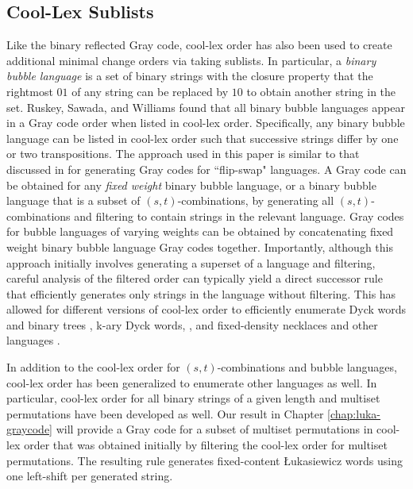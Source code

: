 



\subsection{Cool-Lex Sublists}

Like the binary reflected Gray code, cool-lex order has also been used to create additional minimal change orders via taking sublists. In particular, a \emph{binary bubble language} is a set of binary strings with the closure property that the rightmost $01$ of any string can be replaced by $10$ to obtain another string in the set.  Ruskey, Sawada, and Williams found that all binary bubble languages appear in a Gray code order when listed in cool-lex order.  Specifically, any binary bubble language can be listed in cool-lex order such that successive strings differ by one or two transpositions.  The approach used in this paper is similar to that discussed in \cite{sawada2021inside} for generating Gray codes for ``flip-swap" languages.  A Gray code can be obtained for any \emph{fixed weight} binary bubble language, or a binary bubble language that is a subset of $(s,t)$-combinations, by generating all $(s,t)$-combinations and filtering to contain strings in the relevant language.  Gray codes for bubble languages of varying weights can be obtained by concatenating fixed weight binary bubble language Gray codes together.
Importantly, although this approach initially involves generating a superset of a language and filtering, careful analysis of the filtered order can typically yield a direct successor rule that efficiently generates only strings in the language without filtering.  This has allowed for different versions of cool-lex order to efficiently enumerate Dyck words and binary trees \cite{ruskey2008generating}, k-ary Dyck words, \cite{durocher2012cool}, and fixed-density necklaces and other languages \cite{sawada2009fixed}.  

In addition to the cool-lex order for $(s,t)$-combinations and bubble languages, cool-lex order has been generalized to enumerate other languages as well.  In particular, cool-lex order for all binary strings of a given length \cite{stevens2012coolest} and multiset permutations \cite{williams2009loopless} have been developed as well.  Our result in Chapter \ref{chap:luka-graycode} will provide a Gray code for a subset of multiset permutations in cool-lex order that was obtained initially by filtering the cool-lex order for multiset permutations.  The resulting rule generates fixed-content Łukasiewicz words using one left-shift per generated string.


